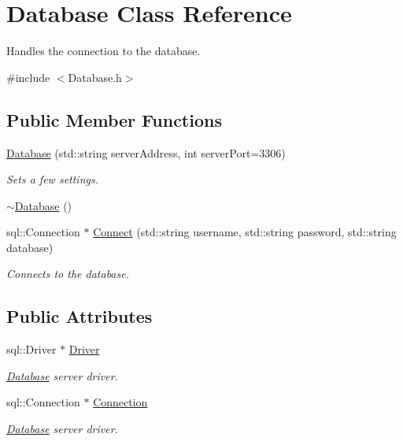 \hypertarget{classDatabase}{\section{Database Class Reference}
\label{classDatabase}
}


Handles the connection to the database.  




{\ttfamily \#include $<$Database.\-h$>$}

\subsection*{Public Member Functions}
\begin{DoxyCompactItemize}
\item 
\hyperlink{classDatabase_acebb76b52b5efea89c7417d65bb5980e}{Database} (std\-::string server\-Address, int server\-Port=3306)
\begin{DoxyCompactList}\small\item\em Sets a few settings. \end{DoxyCompactList}\item 
\hyperlink{classDatabase_a84d399a2ad58d69daab9b05330e1316d}{$\sim$\-Database} ()
\item 
sql\-::\-Connection $\ast$ \hyperlink{classDatabase_a22555b63ce54c0b4a0e1b1aecb5e1bd4}{Connect} (std\-::string username, std\-::string password, std\-::string database)
\begin{DoxyCompactList}\small\item\em Connects to the database. \end{DoxyCompactList}\end{DoxyCompactItemize}
\subsection*{Public Attributes}
\begin{DoxyCompactItemize}
\item 
\hypertarget{classDatabase_af6294bc6951029de6c33c90a7d298541}{sql\-::\-Driver $\ast$ \hyperlink{classDatabase_af6294bc6951029de6c33c90a7d298541}{Driver}}\label{classDatabase_af6294bc6951029de6c33c90a7d298541}

\begin{DoxyCompactList}\small\item\em \hyperlink{classDatabase}{Database} server driver. \end{DoxyCompactList}\item 
\hypertarget{classDatabase_a4239c1a10072aacab2c09d2beb0a096e}{sql\-::\-Connection $\ast$ \hyperlink{classDatabase_a4239c1a10072aacab2c09d2beb0a096e}{Connection}}\label{classDatabase_a4239c1a10072aacab2c09d2beb0a096e}

\begin{DoxyCompactList}\small\item\em \hyperlink{classDatabase}{Database} server driver. \end{DoxyCompactList}\end{DoxyCompactItemize}
